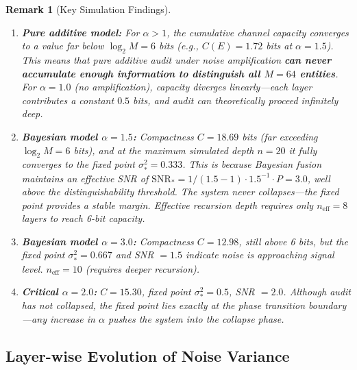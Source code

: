 \documentclass[12pt,a4paper]{article}
\newtheorem{remark}[theorem]{Remark}
\theoremstyle{definition}
\newcommand{\SNR}{\mathrm{SNR}}
\begin{document}
\begin{remark}[Key Simulation Findings]
\begin{enumerate}[leftmargin=*, label=\textbf{---}]
    \item \textbf{Pure additive model:} For $\alpha > 1$, the cumulative channel capacity converges to a value far below $\log_2 M = 6$ bits (e.g., $C(E)=1.72$ bits at $\alpha=1.5$). This means that pure additive audit under noise amplification \textbf{can never accumulate enough information to distinguish all $M=64$ entities}. For $\alpha=1.0$ (no amplification), capacity diverges linearly---each layer contributes a constant $0.5$ bits, and audit can theoretically proceed infinitely deep.

    \item \textbf{Bayesian model $\alpha=1.5$:} Compactness $C = 18.69$ bits (far exceeding $\log_2 M = 6$ bits), and at the maximum simulated depth $n=20$ it fully converges to the fixed point $\sigma_*^2 = 0.333$. This is because Bayesian fusion maintains an effective SNR of $\SNR_* = 1/(1.5 - 1) \cdot 1.5^{-1} \cdot P = 3.0$, well above the distinguishability threshold. The system never collapses---the fixed point provides a stable margin. Effective recursion depth requires only $n_{\text{eff}} = 8$ layers to reach 6-bit capacity.

    \item \textbf{Bayesian model $\alpha=3.0$:} Compactness $C = 12.98$, still above 6 bits, but the fixed point $\sigma_*^2 = 0.667$ and SNR $= 1.5$ indicate noise is approaching signal level. $n_{\text{eff}} = 10$ (requires deeper recursion).

    \item \textbf{Critical $\alpha=2.0$:} $C = 15.30$, fixed point $\sigma_*^2 = 0.5$, SNR $= 2.0$. Although audit has not collapsed, the fixed point lies exactly at the phase transition boundary---any increase in $\alpha$ pushes the system into the collapse phase.
\end{enumerate}
\end{remark}

\subsection{Layer-wise Evolution of Noise Variance}
\end{document}
